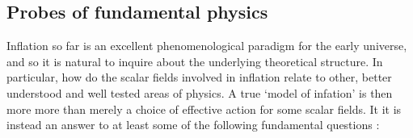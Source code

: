 \documentclass[a4paper,10pt]{article}
\begin{document}





\subsection{Probes of fundamental physics}

Inflation so far is an excellent phenomenological paradigm for the early universe, and so it is natural to inquire about the underlying theoretical structure. In particular, how do the scalar fields involved in inflation relate to other, better understood and well tested areas of physics. A true `model of infation' is then more more than merely a choice of  effective action for some scalar fields. It it is instead an answer to at least some of the following fundamental questions \cite{CMBPol}:
\end{document}
